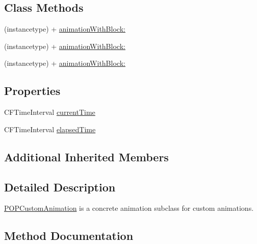 \subsection*{Class Methods}
\begin{DoxyCompactItemize}
\item 
(instancetype) + \mbox{\hyperlink{interface_p_o_p_custom_animation_a29cfdbe36ee1a37a6e9a37eb934a13e1}{animation\+With\+Block\+:}}
\item 
(instancetype) + \mbox{\hyperlink{interface_p_o_p_custom_animation_a29cfdbe36ee1a37a6e9a37eb934a13e1}{animation\+With\+Block\+:}}
\item 
(instancetype) + \mbox{\hyperlink{interface_p_o_p_custom_animation_a29cfdbe36ee1a37a6e9a37eb934a13e1}{animation\+With\+Block\+:}}
\end{DoxyCompactItemize}
\subsection*{Properties}
\begin{DoxyCompactItemize}
\item 
C\+F\+Time\+Interval \mbox{\hyperlink{interface_p_o_p_custom_animation_a8dc8227a217bc8eaa5e5c54e39d56888}{current\+Time}}
\item 
C\+F\+Time\+Interval \mbox{\hyperlink{interface_p_o_p_custom_animation_a71d07606fdc11efd303df510259cc7f1}{elapsed\+Time}}
\end{DoxyCompactItemize}
\subsection*{Additional Inherited Members}


\subsection{Detailed Description}
\mbox{\hyperlink{interface_p_o_p_custom_animation}{P\+O\+P\+Custom\+Animation}} is a concrete animation subclass for custom animations. 

\subsection{Method Documentation}
\mbox{\label{interface_p_o_p_custom_animation_a29cfdbe36ee1a37a6e9a37eb934a13e1}} 
